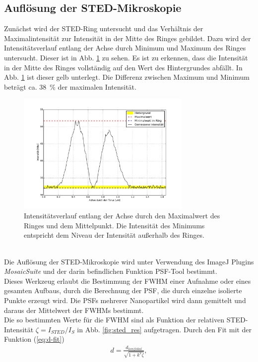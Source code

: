 \subsection{Auflösung der STED-Mikroskopie}
Zunächst wird der STED-Ring untersucht und das Verhältnis der Maximalintensität zur Intensität in der Mitte des Ringes gebildet.
Dazu wird der Intensitätsverlauf entlang der Achse durch Minimum und Maximum des Ringes untersucht. Dieser ist in Abb. \ref{fig:doughnut} zu sehen.
Es ist zu erkennen, dass die Intensität in der Mitte des Ringes vollständig auf den Wert des Hintergrundes abfällt.
In Abb. \ref{fig:doughnut} ist dieser gelb unterlegt.
Die Differenz zwischen Maximum und Minimum beträgt ca. 38~\% der maximalen Intensität. 
\begin{figure}
	\centering
	\includegraphics[width=0.75\textwidth]{plots/doughnut.pdf}
	\caption{Intensitätsverlauf entlang der Achse durch den Maximalwert des Ringes und dem Mittelpunkt.
	Die Intensität des Minimums entspricht dem Niveau der Intensität außerhalb des Ringes.}
	\label{fig:doughnut}
\end{figure}
\\ 
Die Auflösung der STED-Mikroskopie wird unter Verwendung des ImageJ Plugins \emph{MosaicSuite} und der darin befindlichen Funktion PSF-Tool bestimmt.\\
Dieses Werkzeug erlaubt die Bestimmung der FWHM einer Aufnahme oder eines gesamten Aufbaus, durch die Berechnung der PSF, die durch einzelne isolierte Punkte erzeugt wird.
Die PSFs mehrerer Nanopartikel wird dann gemittelt und daraus der Mittelwert der FWHMs bestimmt.
\\
Die so bestimmten Werte für die FWHM sind als Funktion der relativen STED-Intensität $\zeta = I_{STED}/I_S$ in Abb. \ref{fig:sted_res} aufgetragen.
Durch den Fit mit der Funktion (\ref{eq:d-fit})
\begin{align}
	d = \frac{d_{konfokal}}{\sqrt{1+k^2\zeta}}, \label{eq:d-fit}
\end{align}
